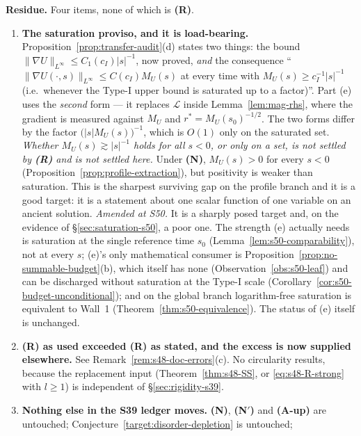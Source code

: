 \documentclass[11pt]{article}
\theoremstyle{definition}
\theoremstyle{remark}
\begin{document}
\medskip
\noindent\textbf{Residue.} Four items, none of which is \textbf{(R)}.

\begin{enumerate}[label=(\arabic*),leftmargin=2.4em]
\item \textbf{The saturation proviso, and it is load-bearing.}
  Proposition~\ref{prop:transfer-audit}(d) states two things: the bound
  $\|\nabla U\|_{L^\infty}\leq C_1(c_I)|s|^{-1}$, now proved, \emph{and} the
  consequence ``$\|\nabla U(\cdot,s)\|_{L^\infty}\leq C(c_I)M_U(s)$ at every
  time with $M_U(s)\geq c_I^{-1}|s|^{-1}$ (i.e.\ whenever the Type-I upper
  bound is saturated up to a factor)''. Part (e) uses the \emph{second} form
  --- it replaces $\mathcal{L}$ inside Lemma~\ref{lem:mag-rhs}, where the
  gradient is measured against $M_U$ and $r^*=M_U(s_0)^{-1/2}$. The two forms
  differ by the factor $\bigl(|s|M_U(s)\bigr)^{-1}$, which is $O(1)$ only on
  the saturated set. \emph{Whether $M_U(s)\gtrsim|s|^{-1}$ holds for all
  $s<0$, or only on a set, is not settled by \textbf{(R)} and is not settled
  here.} Under \textbf{(N)}, $M_U(s)>0$ for every $s<0$
  (Proposition~\ref{prop:profile-extraction}), but positivity is weaker than
  saturation. This is the sharpest surviving gap on the profile branch and it
  is a good target: it is a statement about one scalar function of one
  variable on an ancient solution.
  \emph{Amended at S50.} It is a sharply posed target and, on the evidence of
  \S\ref{sec:saturation-s50}, a poor one. The strength (e) actually needs is
  saturation at the single reference time $s_0$
  (Lemma~\ref{lem:s50-comparability}), not at every $s$; (e)'s only
  mathematical consumer is
  Proposition~\ref{prop:no-summable-budget}(b), which itself has none
  (Observation~\ref{obs:s50-leaf}) and can be discharged without saturation at
  the Type-I scale (Corollary~\ref{cor:s50-budget-unconditional}); and on the
  global branch logarithm-free saturation is equivalent to Wall~1
  (Theorem~\ref{thm:s50-equivalence}). The status of (e) itself is
  unchanged.
\item \textbf{(R) as used exceeded (R) as stated, and the excess is now
  supplied elsewhere.} See Remark~\ref{rem:s48-doc-errors}(c). No
  circularity results, because the replacement input
  (Theorem~\ref{thm:s48-SS}, or \eqref{eq:s48-R-strong} with $l\geq1$) is
  independent of \S\ref{sec:rigidity-s39}.
\item \textbf{Nothing else in the S39 ledger moves.} \textbf{(N)},
  \textbf{(N$'$)} and \textbf{(A-up)} are untouched;
  Conjecture~\ref{target:disorder-depletion} is untouched;

\end{enumerate}
\end{document}
